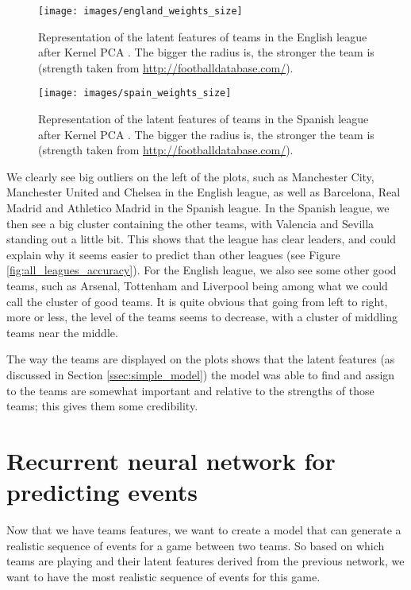\documentclass[10pt,conference,onecolumn]{IEEEtran}
\begin{document}
\begin{figure}[H]
\centering
\texttt{[image: images/england\_weights\_size]}
\caption{Representation of the latent features of teams in the English league after Kernel PCA \cite{kernel_pca}. The bigger the radius is, the stronger the team is (strength taken from \url{http://footballdatabase.com/}).}
\label{fig:england_weights}
\end{figure}

\begin{figure}[H]
\centering
\texttt{[image: images/spain\_weights\_size]}
\caption{Representation of the latent features of teams in the Spanish league after Kernel PCA \cite{kernel_pca}. The bigger the radius is, the stronger the team is (strength taken from \url{http://footballdatabase.com/}).}
\label{fig:spain_weights}
\end{figure}

We clearly see big outliers on the left of the plots, such as Manchester City, Manchester United and Chelsea in the English league, as well as Barcelona, Real Madrid and Athletico Madrid in the Spanish league. In the Spanish league, we then see a big cluster containing the other teams, with Valencia and Sevilla standing out a little bit. This shows that the league has clear leaders, and could explain why it seems easier to predict than other leagues (see Figure \ref{fig:all_leagues_accuracy}). For the English league, we also see some other good teams, such as Arsenal, Tottenham and Liverpool being among what we could call the cluster of good teams. It is quite obvious that going from left to right, more or less, the level of the teams seems to decrease, with a cluster of middling teams near the middle.

The way the teams are displayed on the plots shows that the latent features (as discussed in Section \ref{ssec:simple_model}) the model was able to find and assign to the teams are somewhat important and relative to the strengths of those teams; this gives them some credibility.


\section{Recurrent neural network for predicting events} \label{sec:rnn}
Now that we have teams features, we want to create a model that can generate a realistic sequence of events for a game between two teams. So based on which teams are playing and their latent features derived from the previous network, we want to have the most realistic sequence of events for this game.
\end{document}
